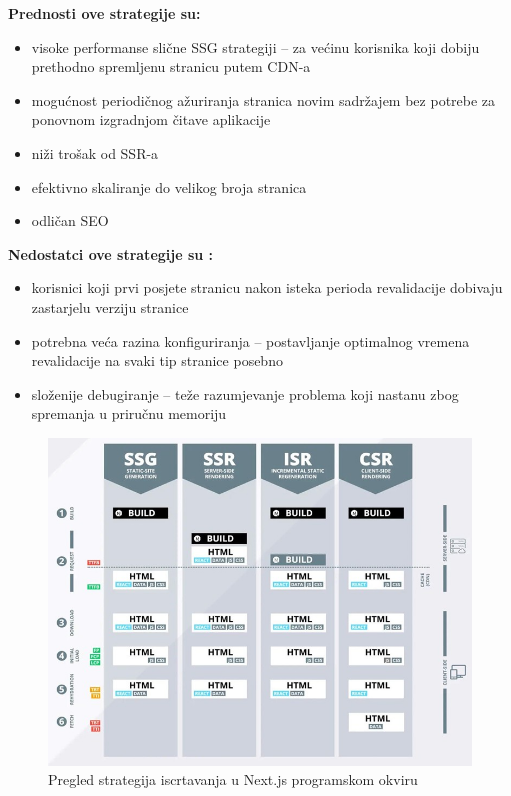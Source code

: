 \bigskip

\textbf{Prednosti ove strategije su:}
\begin{itemize}
    \item visoke performanse slične SSG strategiji – za većinu korisnika koji dobiju prethodno spremljenu stranicu putem CDN-a
    \item mogućnost periodičnog ažuriranja stranica novim sadržajem bez potrebe za ponovnom izgradnjom čitave aplikacije
    \item niži trošak od SSR-a
    \item efektivno skaliranje do velikog broja stranica
    \item odličan SEO
\end{itemize}

\bigskip

\textbf{Nedostatci ove strategije su \cite{flaws2021isr}:}

\begin{itemize}
    \item korisnici koji prvi posjete stranicu nakon isteka perioda revalidacije dobivaju zastarjelu verziju stranice
    \item potrebna veća razina konfiguriranja – postavljanje optimalnog vremena revalidacije na svaki tip stranice posebno
    \item složenije debugiranje – teže razumjevanje problema koji nastanu zbog spremanja u priručnu memoriju
\end{itemize}


\begin{figure}[H]
    \centering
    \includegraphics[width=\textwidth]{slike/uvod/pregled-strategija-iscrtavanja.jpg}
    \caption{Pregled strategija iscrtavanja u Next.js programskom okviru \cite{dumais2021nextjs}}
    \label{fig:pregled-strategija-iscrtavanja}
\end{figure}
